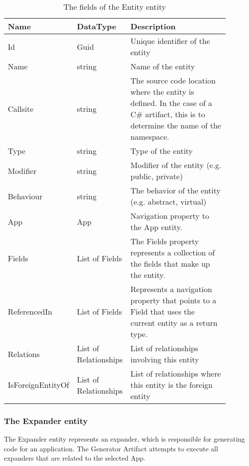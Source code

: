 \begin{table}[H]
\small
\begin{tabular}{ p{0.20\linewidth} p{0.24\linewidth} p{0.46\linewidth} }
\hline
\textbf{Name} & \textbf{DataType} & \textbf{Description} \\
\hline
Id & Guid & Unique identifier of the entity \\
Name & string & Name of the entity \\
Callsite & string & The source code location where the entity is defined. In the case of a C\#
artifact, this is to determine the name of the namespace.\\
Type & string & Type of the entity \\
Modifier & string & Modifier of the entity (e.g. public, private) \\
Behaviour & string & The behavior of the entity (e.g. abstract, virtual) \\
App & App & Navigation property to the App entity. \\
Fields & List of Fields & The Fields property represents a collection of the fields that
make up the entity. \\
ReferencedIn & List of Fields & Represents a navigation property that points to a Field
that uses the current entity as a return type. \\
Relations & List of Relationships & List of relationships involving this entity \\
IsForeignEntityOf & List of Relationships & List of relationships where this entity is the foreign entity \\
\hline
\end{tabular}
\caption{The fields of the Entity entity}
\label{table:entity_entity}
\end{table}

\subsubsection{The Expander entity}

The Expander entity represents an expander, which is responsible for generating code for
an application. The Generator Artifact attempts to execute all expanders that are related
to the selected App.

